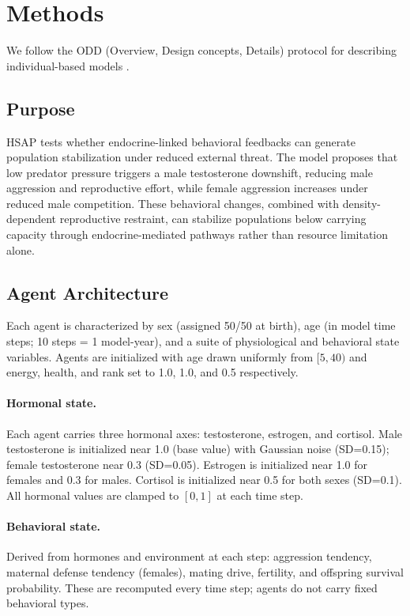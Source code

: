 \section{Methods}
\label{sec:methods}

We follow the ODD (Overview, Design concepts, Details) protocol for describing individual-based models \citep{grimm2006}.

\subsection{Purpose}
\label{sec:purpose}

HSAP tests whether endocrine-linked behavioral feedbacks can generate population stabilization under reduced external threat. The model proposes that low predator pressure triggers a male testosterone downshift, reducing male aggression and reproductive effort, while female aggression increases under reduced male competition. These behavioral changes, combined with density-dependent reproductive restraint, can stabilize populations below carrying capacity through endocrine-mediated pathways rather than resource limitation alone.

\subsection{Agent Architecture}
\label{sec:agent}

Each agent is characterized by sex (assigned 50/50 at birth), age (in model time steps; 10 steps = 1 model-year), and a suite of physiological and behavioral state variables. Agents are initialized with age drawn uniformly from $[5, 40)$ and energy, health, and rank set to 1.0, 1.0, and 0.5 respectively.

\paragraph{Hormonal state.}
Each agent carries three hormonal axes: testosterone, estrogen, and cortisol. Male testosterone is initialized near 1.0 (base value) with Gaussian noise (SD=0.15); female testosterone near 0.3 (SD=0.05). Estrogen is initialized near 1.0 for females and 0.3 for males. Cortisol is initialized near 0.5 for both sexes (SD=0.1). All hormonal values are clamped to $[0, 1]$ at each time step.

\paragraph{Behavioral state.}
Derived from hormones and environment at each step: aggression tendency, maternal defense tendency (females), mating drive, fertility, and offspring survival probability. These are recomputed every time step; agents do not carry fixed behavioral types.

